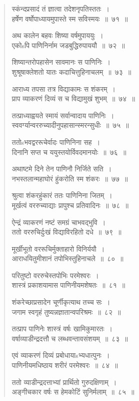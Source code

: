 \documentclass[11pt, openany]{book}
\begin{document}
\newpage

\begin{multicols}{2}
\begin{quote}
{\mbh स्कंन्दप्रसादं तं ज्ञात्वा तदेशनृपतिस्ततः~।\\
हर्षेण वर्षोपाध्यायमुपास्ते स्म सविस्मयः~॥~७१~॥

अथ कालेन बहवः शिष्या वर्षमुपाययुः~।\\
एकोsपि पाणिनिर्नाम जडबुद्धिरुपाययौ~॥~७२~॥

शिष्यान्तरोपहासेन सावमानः स पाणिनिः~।\\
शुश्रूषाक्लेशतो यातः कदाचित्तुहिनाचलम्~॥~७३~॥

आराध्य तपसा तत्र विद्याकामः स शंकरम्~।\\
प्राप व्याकरणं दिव्यं स च विद्यामुखं शुभम्~॥~७४~॥

तत्प्राध्याह्वयते स्मायं सर्वान्वादाय पाणिनिः~।\\
स्ववर्ग्यान्वररुच्यादीनुपहासान्स्मरन्सुधीः~॥~७५~॥

ततोsभवद्वररूचेर्वादः पाणिनिना सह~।\\
दिनानि सप्त च ययुस्तयोर्विवदमानयोः~॥~७६~॥

अथाष्टमे दिने तेन पाणिनौ निर्जिते सति~।\\
नभस्तलान्महाघोरं हुंकरोति स्म शंकरः~॥~७७~॥

श्रुत्वा शंकरहुंकारं ततः पाणिनिना जितम्~।\\
मूर्खत्वं वररुच्याद्याः प्रापुश्च प्रतिवादिनः~॥~७८~॥

ऐन्द्रं व्याकरणं नष्टं समग्रं चाभवद्भुवि~।\\
ततो वररुचिर्दुःखं विद्याविरहितो दधे~॥~७९~॥

मूर्खीभूतो वररूचिर्मुक्ताहारो विनिर्ययौ~।\\
आराधयितुमीशानं तपोभिस्तुहिनाचले~॥~८०~॥

परितुष्टो वररुचेस्तपोभिः परमेश्वरः~।\\
शास्त्रं प्रकाशयामास पाणिनीयमशेषतः~॥~८१~॥

शंकरेच्छाप्रसादेन चूर्णीकृत्याथ तच्च सः~।\\
जगाम स्वगृहं तुष्यन्नज्ञातान्वपरिश्रमः~॥~८२~॥

तत्प्राप पाणिनेः शास्त्रं वर्षः खामिकुमारतः~।\\
वर्षाव्याडीन्द्रदत्तौ च लब्धवन्तावसंशयम्~॥~८३~॥

एवं व्याकरणं दिव्यं प्रबोधायाsभ्यधात्पुनः~।\\
पाणिनीयमधिष्ठाय शरीरं परमेश्वरः~॥~८४~॥

ततो व्याडीन्द्रदत्ताभ्यां प्रार्थितो गुरुदक्षिणाम्~।\\
अङ्गीचकार वर्षः स हेमकोटिं सुनिर्मलाम्~॥~८५~॥

}
\end{quote}
\end{multicols}
\end{document}
